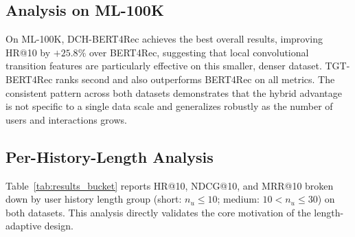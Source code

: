 \documentclass[12pt,a4paper]{report}
\begin{document}
\subsection*{Analysis on ML-100K}

On ML-100K, DCH-BERT4Rec achieves the best overall results, improving HR@10
by \(+25.8\%\) over BERT4Rec, suggesting that local convolutional transition
features are particularly effective on this smaller, denser dataset.
TGT-BERT4Rec ranks second and also outperforms BERT4Rec on all metrics.
The consistent pattern across both datasets demonstrates that the hybrid
advantage is not specific to a single data scale and generalizes robustly as
the number of users and interactions grows.

\subsection*{Per-History-Length Analysis}

Table~\ref{tab:results_bucket} reports HR@10, NDCG@10, and MRR@10 broken
down by user history length group (short: \(n_u \leq 10\); medium:
\(10 < n_u \leq 30\)) on both datasets. This analysis directly validates the
core motivation of the length-adaptive design.
\end{document}
